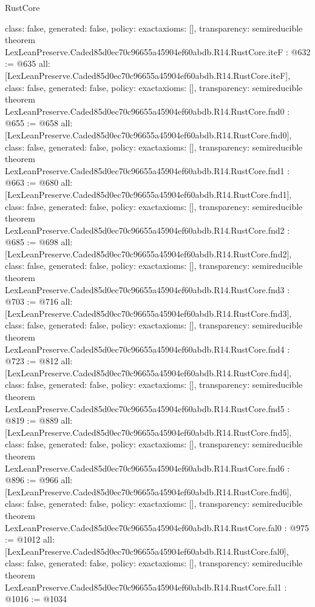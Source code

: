 \begin{lexlean}{RustCore}
\begin{coremodule}
{  class: false,
  generated: false,
  policy: exact{axioms: []},
  transparency: semireducible
}
theorem LexLeanPreserve.Caded85d0ec70c96655a45904ef60abdb.R14.RustCore.iteF : @632 := @635 {
  all: [LexLeanPreserve.Caded85d0ec70c96655a45904ef60abdb.R14.RustCore.iteF],
  class: false,
  generated: false,
  policy: exact{axioms: []},
  transparency: semireducible
}
theorem LexLeanPreserve.Caded85d0ec70c96655a45904ef60abdb.R14.RustCore.fnd0 : @655 := @658 {
  all: [LexLeanPreserve.Caded85d0ec70c96655a45904ef60abdb.R14.RustCore.fnd0],
  class: false,
  generated: false,
  policy: exact{axioms: []},
  transparency: semireducible
}
theorem LexLeanPreserve.Caded85d0ec70c96655a45904ef60abdb.R14.RustCore.fnd1 : @663 := @680 {
  all: [LexLeanPreserve.Caded85d0ec70c96655a45904ef60abdb.R14.RustCore.fnd1],
  class: false,
  generated: false,
  policy: exact{axioms: []},
  transparency: semireducible
}
theorem LexLeanPreserve.Caded85d0ec70c96655a45904ef60abdb.R14.RustCore.fnd2 : @685 := @698 {
  all: [LexLeanPreserve.Caded85d0ec70c96655a45904ef60abdb.R14.RustCore.fnd2],
  class: false,
  generated: false,
  policy: exact{axioms: []},
  transparency: semireducible
}
theorem LexLeanPreserve.Caded85d0ec70c96655a45904ef60abdb.R14.RustCore.fnd3 : @703 := @716 {
  all: [LexLeanPreserve.Caded85d0ec70c96655a45904ef60abdb.R14.RustCore.fnd3],
  class: false,
  generated: false,
  policy: exact{axioms: []},
  transparency: semireducible
}
theorem LexLeanPreserve.Caded85d0ec70c96655a45904ef60abdb.R14.RustCore.fnd4 : @723 := @812 {
  all: [LexLeanPreserve.Caded85d0ec70c96655a45904ef60abdb.R14.RustCore.fnd4],
  class: false,
  generated: false,
  policy: exact{axioms: []},
  transparency: semireducible
}
theorem LexLeanPreserve.Caded85d0ec70c96655a45904ef60abdb.R14.RustCore.fnd5 : @819 := @889 {
  all: [LexLeanPreserve.Caded85d0ec70c96655a45904ef60abdb.R14.RustCore.fnd5],
  class: false,
  generated: false,
  policy: exact{axioms: []},
  transparency: semireducible
}
theorem LexLeanPreserve.Caded85d0ec70c96655a45904ef60abdb.R14.RustCore.fnd6 : @896 := @966 {
  all: [LexLeanPreserve.Caded85d0ec70c96655a45904ef60abdb.R14.RustCore.fnd6],
  class: false,
  generated: false,
  policy: exact{axioms: []},
  transparency: semireducible
}
theorem LexLeanPreserve.Caded85d0ec70c96655a45904ef60abdb.R14.RustCore.fal0 : @975 := @1012 {
  all: [LexLeanPreserve.Caded85d0ec70c96655a45904ef60abdb.R14.RustCore.fal0],
  class: false,
  generated: false,
  policy: exact{axioms: []},
  transparency: semireducible
}
theorem LexLeanPreserve.Caded85d0ec70c96655a45904ef60abdb.R14.RustCore.fal1 : @1016 := @1034 {
}
\end{coremodule}
\end{lexlean}
